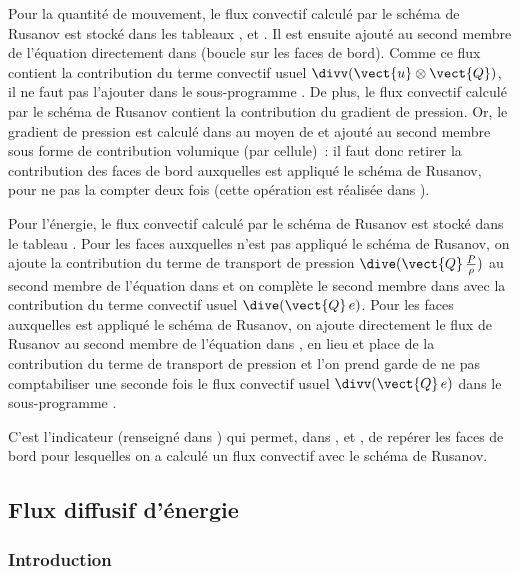 Pour la quantité de mouvement, le flux convectif calculé par le schéma de
Rusanov  est stocké dans les tableaux
,  et
. Il est ensuite ajouté au second membre de
l'équation directement dans  (boucle sur les faces de bord).
Comme ce flux contient la contribution du terme convectif usuel
$\divv(\vect{u}\otimes\vect{Q})$, il ne faut pas l'ajouter dans
le sous-programme .
De plus, le flux convectif calculé par le schéma de Rusanov
contient la contribution du
gradient de pression. Or, le gradient de pression est calculé dans
 au moyen de  et ajouté au second membre
sous forme de contribution volumique (par cellule)~: il faut donc retirer
la contribution des faces de bord auxquelles est appliqué le schéma de
Rusanov, pour ne pas la compter deux fois (cette opération est réalisée
dans ).

Pour l'énergie, le flux convectif calculé par le schéma de
Rusanov est stocké dans le tableau
. Pour les faces auxquelles n'est pas
appliqué le schéma de Rusanov, on ajoute la contribution
du terme de transport de pression $\dive(\vect{Q}\,\frac{P}{\rho})$
au second membre de l'équation dans 
et on complète le second membre dans  avec la contribution du
terme convectif usuel $\dive(\vect{Q}\,e)$. Pour les faces auxquelles est
appliqué le schéma de Rusanov, on ajoute directement le flux de Rusanov au second
membre de l'équation dans , en lieu et place de la contribution
du terme de transport de pression et l'on prend garde de ne pas
comptabiliser une seconde fois le flux convectif usuel
$\divv(\vect{Q}\,e)$ dans le sous-programme .

C'est l'indicateur 
(renseigné dans ) qui permet, dans ,
 et ,
de repérer les faces de bord pour lesquelles on a calculé
un flux convectif avec le schéma de Rusanov.


\subsection*{Flux diffusif d'énergie}

\subsubsection*{Introduction}

